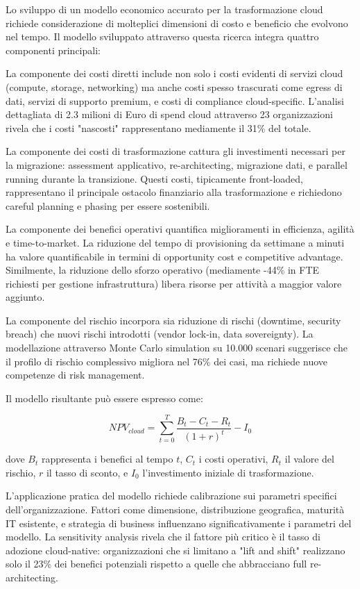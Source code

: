 Lo sviluppo di un modello economico accurato per la trasformazione cloud richiede considerazione di molteplici dimensioni di costo e beneficio che evolvono nel tempo. Il modello sviluppato attraverso questa ricerca integra quattro componenti principali:

La componente dei costi diretti include non solo i costi evidenti di servizi cloud (compute, storage, networking) ma anche costi spesso trascurati come egress di dati, servizi di supporto premium, e costi di compliance cloud-specific. L'analisi dettagliata di 2.3 milioni di Euro di spend cloud attraverso 23 organizzazioni rivela che i costi "nascosti" rappresentano mediamente il 31\% del totale.

La componente dei costi di trasformazione cattura gli investimenti necessari per la migrazione: assessment applicativo, re-architecting, migrazione dati, e parallel running durante la transizione. Questi costi, tipicamente front-loaded, rappresentano il principale ostacolo finanziario alla trasformazione e richiedono careful planning e phasing per essere sostenibili.

La componente dei benefici operativi quantifica miglioramenti in efficienza, agilità e time-to-market. La riduzione del tempo di provisioning da settimane a minuti ha valore quantificabile in termini di opportunity cost e competitive advantage. Similmente, la riduzione dello sforzo operativo (mediamente -44\% in FTE richiesti per gestione infrastruttura) libera risorse per attività a maggior valore aggiunto.

La componente del rischio incorpora sia riduzione di rischi (downtime, security breach) che nuovi rischi introdotti (vendor lock-in, data sovereignty). La modellazione attraverso Monte Carlo simulation su 10.000 scenari suggerisce che il profilo di rischio complessivo migliora nel 76\% dei casi, ma richiede nuove competenze di risk management.

Il modello risultante può essere espresso come:

\begin{equation}
NPV_{cloud} = \sum_{t=0}^{T} \frac{B_t - C_t - R_t}{(1+r)^t} - I_0
\end{equation}

dove $B_t$ rappresenta i benefici al tempo $t$, $C_t$ i costi operativi, $R_t$ il valore del rischio, $r$ il tasso di sconto, e $I_0$ l'investimento iniziale di trasformazione.

L'applicazione pratica del modello richiede calibrazione sui parametri specifici dell'organizzazione. Fattori come dimensione, distribuzione geografica, maturità IT esistente, e strategia di business influenzano significativamente i parametri del modello. La sensitivity analysis rivela che il fattore più critico è il tasso di adozione cloud-native: organizzazioni che si limitano a "lift and shift" realizzano solo il 23\% dei benefici potenziali rispetto a quelle che abbracciano full re-architecting.

